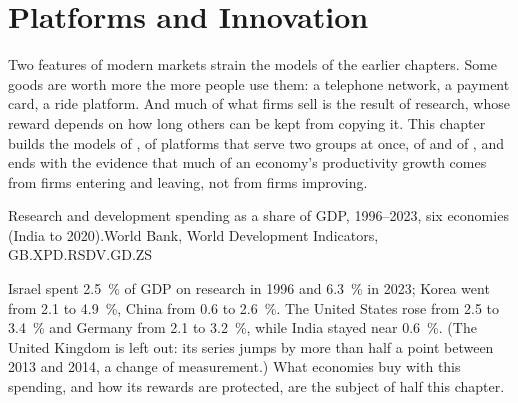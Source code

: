 \chapter{Platforms and Innovation}\label{ch:b3:platforms-and-innovation}

Two features of modern markets strain the models of the earlier chapters. Some
goods are worth more the more people use them: a telephone network, a payment card,
a ride platform. And much of what firms sell is the result of research, whose
reward depends on how long others can be kept from copying it. This chapter builds
the models of , of platforms that serve two groups at once, of
 and of , and ends with the evidence that much of an economy's
productivity growth comes from firms entering and leaving, not from firms improving.

\begin{openingchart}{Research and development spending as a share of GDP,
1996--2023, six economies (India to 2020).}{World Bank, World Development Indicators,
GB.XPD.RSDV.GD.ZS}
\end{openingchart}

Israel spent 2.5~\% of GDP on research in 1996 and 6.3~\% in 2023; Korea went from 2.1 to 4.9~\%, China
from 0.6 to 2.6~\%. The United States rose from 2.5 to 3.4~\% and Germany from 2.1 to 3.2~\%, while India stayed near
0.6~\%. (The United Kingdom is left out: its series jumps by more than half a point
between 2013 and 2014, a change of measurement.) What economies buy with this
spending, and how its rewards are protected, are the subject of half this chapter.

